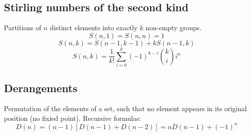 \subsection{Stirling numbers of the second kind}
Partitions of $n$ distinct elements into exactly $k$ non-empty groups.
\[ S(n, 1) = S(n, n) = 1 \]
\[ S(n, k) = S(n - 1, k - 1) + kS(n - 1, k)\]
\[ S(n, k) = \frac{1}{k!} \sum\limits_{i = 0}^{k} (-1)^{k - i} {k \choose i} i^n\]

\subsection{Derangements}
Permutation of the elements of a set, such that no element appears in its original position (no fixied point). Recursive formulas:
\[D(n) = (n - 1)[D(n - 1) + D(n - 2)] = nD(n - 1) + (-1)^n\]
